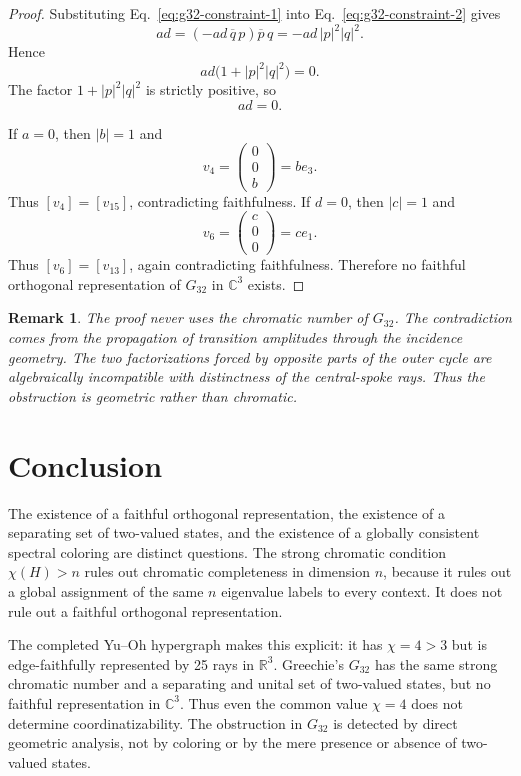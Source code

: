 \documentclass[aps,pra,twocolumn,superscriptaddress,10pt]{revtex4-2}
\newtheorem{remark}[theorem]{Remark}
\newcommand{\C}{\mathbb{C}}
\newcommand{\R}{\mathbb{R}}
\begin{document}
\begin{proof}
Substituting Eq.~\eqref{eq:g32-constraint-1} into
Eq.~\eqref{eq:g32-constraint-2} gives
\[
    ad=(-ad\,\overline q\,p)\overline p\,q
      =-ad\,|p|^2|q|^2.
\]
Hence
\[
    ad\bigl(1+|p|^2|q|^2\bigr)=0.
\]
The factor $1+|p|^2|q|^2$ is strictly positive, so
\[
    ad=0.
\]

If $a=0$, then $|b|=1$ and
\[
    v_4=\begin{pmatrix}0\\0\\b\end{pmatrix}=b e_3.
\]
Thus $[v_4]=[v_{15}]$, contradicting faithfulness.  If $d=0$, then
$|c|=1$ and
\[
    v_6=\begin{pmatrix}c\\0\\0\end{pmatrix}=c e_1.
\]
Thus $[v_6]=[v_{13}]$, again contradicting faithfulness.  Therefore no
faithful orthogonal representation of $G_{32}$ in $\C^3$ exists.
\end{proof}

\begin{remark}
The proof never uses the chromatic number of $G_{32}$.  The contradiction
comes from the propagation of transition amplitudes through the incidence
geometry.  The two factorizations forced by opposite parts of the outer
cycle are algebraically incompatible with distinctness of the central-spoke
rays.  Thus the obstruction is geometric rather than chromatic.
\end{remark}

\section{Conclusion}

The existence of a faithful orthogonal representation, the existence of a
separating set of two-valued states, and the existence of a globally
consistent spectral coloring are distinct questions.  The strong chromatic
condition $\chi(H)>n$ rules out chromatic completeness in dimension $n$,
because it rules out a global assignment of the same $n$ eigenvalue labels
to every context.  It does not rule out a faithful orthogonal representation.

The completed Yu--Oh hypergraph makes this explicit: it has
$\chi=4>3$ but is edge-faithfully represented by 25 rays in $\R^3$.
Greechie's $G_{32}$ has the same strong chromatic number and a separating and
unital set of two-valued states, but no faithful representation in $\C^3$.
Thus even the common value $\chi=4$ does not determine coordinatizability.
The obstruction in $G_{32}$ is detected by direct geometric analysis, not by
coloring or by the mere presence or absence of two-valued states.
\end{document}
